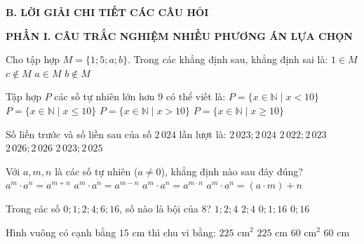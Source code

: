 \documentclass[12pt,a4paper]{article}
\begin{document}
\noindent\textbf{\large B. LỜI GIẢI CHI TIẾT CÁC CÂU HỎI}
\vspace{2mm}

\noindent\textbf{\large PHẦN I. CÂU TRẮC NGHIỆM NHIỀU PHƯƠNG ÁN LỰA CHỌN}
\vspace{1mm}
\begin{ex}
Cho tập hợp $M = \{1; 5; a; b\}$. Trong các khẳng định sau, khẳng định sai là:
\choice
{$1 \in M$}
{$c \notin M$}
{$a \in M$}
{\True $b \notin M$}
\end{ex}

\begin{ex}
Tập hợp $P$ các số tự nhiên lớn hơn 9 có thể viết là:
\choice
{$P = \{x \in \mathbb{N} \mid x < 10\}$}
{$P = \{x \in \mathbb{N} \mid x \le 10\}$}
{$P = \{x \in \mathbb{N} \mid x > 10\}$}
{\True $P = \{x \in \mathbb{N} \mid x \ge 10\}$}
\end{ex}

\begin{ex}
Số liền trước và số liền sau của số $2\,024$ lần lượt là:
\choice
{$2\,023; 2\,024$}
{$2\,022; 2\,023$}
{$2\,026; 2\,026$}
{\True $2\,023; 2\,025$}
\end{ex}

\begin{ex}
Với $a, m, n$ là các số tự nhiên ($a \ne 0$), khẳng định nào sau đây đúng?
\choice
{\True $a^m \cdot a^n = a^{m+n}$}
{$a^m \cdot a^n = a^{m-n}$}
{$a^m \cdot a^n = a^{m \cdot n}$}
{$a^m \cdot a^n = (a \cdot m) + n$}
\end{ex}

\begin{ex}
Trong các số $0; 1; 2; 4; 6; 16$, số nào là bội của 8?
\choice
{$1; 2; 4$}
{$2; 4$}
{$0; 1; 16$}
{\True $0; 16$}
\end{ex}

\begin{ex}
Hình vuông có cạnh bằng $15\text{ cm}$ thì chu vi bằng:
\choice
{$225\text{ cm}^2$}
{$225\text{ cm}$}
{$60\text{ cm}^2$}
{\True $60\text{ cm}$}
\end{ex}
\end{document}
